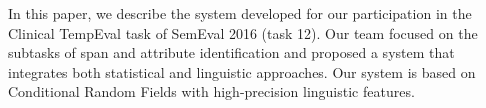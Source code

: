 In this paper, we describe the system developed for our participation in the Clinical TempEval task of SemEval 2016 (task 12). Our team focused on the subtasks of span and attribute identification and proposed a system that integrates both statistical and linguistic approaches. Our system is based on Conditional Random Fields with high-precision linguistic features.
